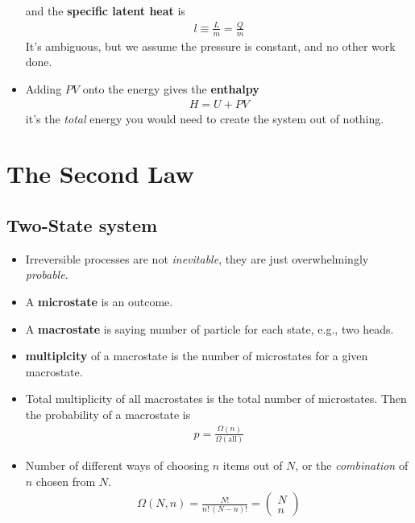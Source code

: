 \documentclass{book}
\begin{document}
\begin{itemize}
	      and the \textbf{specific latent heat} is
	      \begin{align}
		      \label{eq:specific latent}
		      l \equiv \frac{L}{m}= \frac{Q}{m}
	      \end{align}
	      It's ambiguous, but we assume the pressure is constant, and no other work done.
	\item Adding $PV$ onto the energy gives the \textbf{enthalpy}
	      \begin{align}
		      \label{eq:enthalpy}
		      H = U + PV
	      \end{align}
	      it's the \textit{total} energy you would need to create the system out of nothing.



\end{itemize}


\chapter{The Second Law}

\section{Two-State system}%
\label{sec:two state}
\begin{itemize}

	\item Irreversible processes are not \textit{inevitable}, they are just overwhelmingly \textit{probable}.
	\item A \textbf{microstate} is an outcome.
	\item A \textbf{macrostate} is saying number of particle for each state, e.g., two heads.
	\item \textbf{multiplcity} of a macrostate is the number of microstates for a given macrostate.
	\item Total multiplicity of all macrostates is the total number of microstates. Then the probability
	      of a macrostate is
	      \begin{align}
		      p = \frac{\Omega(n)}{\Omega(\text{all})}
	      \end{align}
	\item Number of different ways of choosing $n$ items out of $N$, or the \textit{combination} of $n$
	      chosen from $N$.
	      \begin{align}
		      \label{eq:multiplicity formula}
		      \Omega(N, n) = \frac{N!}{n! \, (N-n)!} =
		      \begin{pmatrix}
			      N \\ n
		      \end{pmatrix}
	      \end{align}
\end{itemize}
\end{document}
